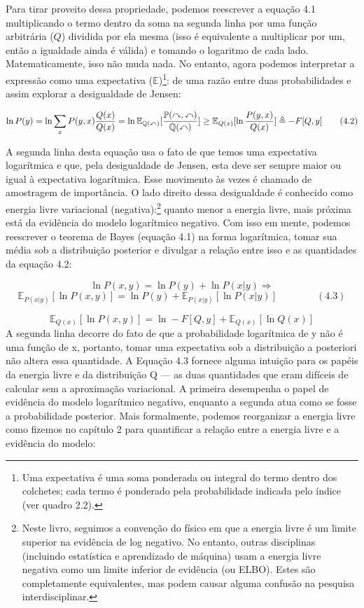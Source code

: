 \documentclass[
  12pt,
]{book}
\begin{document}
Para tirar proveito dessa propriedade, podemos reescrever a equação 4.1
multiplicando o termo dentro da soma na segunda linha por uma função
arbitrária (\(Q\)) dividida por ela mesma (isso é equivalente a
multiplicar por um, então a igualdade ainda é válida) e tomando o
logaritmo de cada lado. Matematicamente, isso não muda nada. No entanto,
agora podemos interpretar a expressão como uma expectativa
(\(\mathbb{E}\))\footnote{Uma expectativa é uma soma ponderada ou integral do termo dentro
  dos colchetes; cada termo é ponderado pela probabilidade indicada
  pelo índice (ver quadro 2.2).}: de uma razão entre duas probabilidades e assim
explorar a desigualdade de Jensen:

\[ \ln P(y) = \ln \sum_x P(y,x){Q(x)\over Q(x)}= \ln \mathbb{E_{Q(x)}[{P(y,x)\over Q(x)}]} \ge \mathbb{E}_{Q(x)} [\ln {P(y,x) \over Q(x)}] \triangleq -F[Q,y] \qquad(4.2)\]

A segunda linha desta equação usa o fato de que temos uma expectativa
logarítmica e que, pela desigualdade de Jensen, esta deve ser sempre
maior ou igual à expectativa logarítmica. Esse movimento às vezes é
chamado de amostragem de importância. O lado direito dessa desigualdade
é conhecido como energia livre variacional (negativa):\footnote{Neste livro, seguimos a convenção do físico em que a energia livre
  é um limite superior na evidência de log negativo. No entanto,
  outras disciplinas (incluindo estatística e aprendizado de máquina)
  usam a energia livre negativa como um limite inferior de evidência
  (ou ELBO). Estes são completamente equivalentes, mas podem causar
  alguma confusão na pesquisa interdisciplinar.} quanto menor
a energia livre, mais próxima está da evidência do modelo logarítmico
negativo. Com isso em mente, podemos reescrever o teorema de Bayes
(equação 4.1) na forma logarítmica, tomar sua média sob a distribuição
posterior e divulgar a relação entre isso e as quantidades da equação
4.2:

\[ \ln P(x,y) = \ln P(y) + \ln P(x|y) \Longrightarrow  \]
\[ \mathbb{E}_{P(x|y)} [\ln P(x,y)] = \ln P(y) + \mathbb{E}_{P(x|y)}[\ln P(x|y)] \qquad\qquad (4.3) \]

\[ \mathbb{E}_{Q(x)} [\ln P(x,y)] = \ln -F[Q,y] + \mathbb{E}_{Q(x)}[\ln Q(x)]\]
A segunda linha decorre do fato de que a probabilidade logarítmica de y
não é uma função de x, portanto, tomar uma expectativa sob a
distribuição a posteriori não altera essa quantidade. A Equação 4.3
fornece alguma intuição para os papéis da energia livre e da
distribuição Q --- as duas quantidades que eram difíceis de calcular sem
a aproximação variacional. A primeira desempenha o papel de evidência do
modelo logarítmico negativo, enquanto a segunda atua como se fosse a
probabilidade posterior. Mais formalmente, podemos reorganizar a energia
livre como fizemos no capítulo 2 para quantificar a relação entre a
energia livre e a evidência do modelo:
\end{document}
